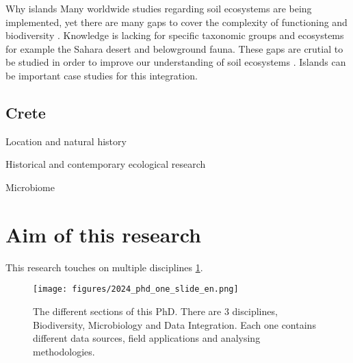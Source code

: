 Why islands
Many worldwide studies regarding soil ecosystems are being implemented, yet
there are many gaps to cover the complexity of functioning and biodiversity
\parencite{guerra2020Blind}. Knowledge is lacking for specific taxonomic groups and
ecosystems for example the Sahara desert and belowground fauna.
These gaps are crutial to be studied in order to
improve our understanding of soil ecosystems \parencite{cameron2018Global}. 
Islands can be important case studies for this integration.

\subsection{Crete}

Location and natural history

Historical and contemporary ecological research

Microbiome

\section{Aim of this research}
\label{sec:aim}

This research touches on multiple disciplines \ref{fig:phd-one-slide}. 

   \begin{figure}[ht]
      \centering
      \texttt{[image: figures/2024\_phd\_one\_slide\_en.png]}
      \caption[Graphical abstract of this PhD]{The different sections of this PhD. There are 3 disciplines, Biodiversity, Microbiology and Data Integration. Each one contains different data sources, field applications and analysing methodologies.}
      \label{fig:phd-one-slide}
   \end{figure}


